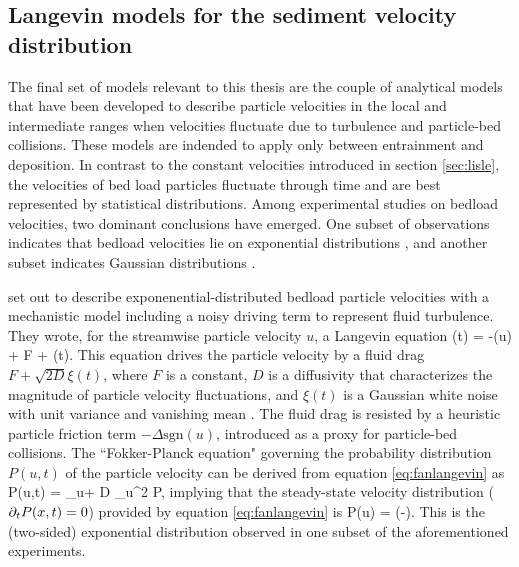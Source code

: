 \subsection{Langevin models for the sediment velocity distribution}

The final set of models relevant to this thesis are the couple of analytical models that have been developed to describe particle velocities in the local and intermediate ranges when velocities fluctuate due to turbulence and particle-bed collisions. These models are indended to apply only between entrainment and deposition.
In contrast to the constant velocities introduced in section \ref{sec:lisle}, the velocities of bed load particles fluctuate through time and are best represented by statistical distributions. 
Among experimental studies on bedload velocities, two dominant conclusions have emerged. One subset of observations indicates that bedload velocities lie on exponential distributions \citep{Lajeunesse2010,Furbish2012,Fathel2015}, and another subset indicates Gaussian distributions \citep{Martin2012,Ancey2014,Heyman2016}.

\citet{Fan2014} set out to describe exponenential-distributed bedload particle velocities with a mechanistic model including a noisy driving term to represent fluid turbulence.
They wrote, for the streamwise particle velocity $u$, a Langevin equation
\be {}(t) = -\Delta {}(u) + F + \xi(t). \label{eq:fanlangevin}\ee
This equation drives the particle velocity by a fluid drag $F + \sqrt{2D} \xi(t)$, where $F$ is a constant, $D$ is a diffusivity that characterizes the magnitude of particle velocity fluctuations, and $\xi(t)$ is a Gaussian white noise with unit variance and vanishing mean \citep{Gardiner1983}. The fluid drag is resisted by a heuristic particle friction term $-\Delta \text{sgn}(u)$, introduced as a proxy for particle-bed collisions. The ``Fokker-Planck equation" governing the probability distribution $P(u,t)$ of the particle velocity can be derived from equation \ref{eq:fanlangevin} as \citep{Risken1984,VanKampen2007} 
\be \pt P(u,t) = \Delta\partial_u + D \partial_u^2 P,\ee
implying that the steady-state velocity distribution ($\partial_t P(x,t) = 0$) provided by equation \ref{eq:fanlangevin} is
\be P(u) = \exp\Big(-\Big).\ee
This is the (two-sided) exponential distribution observed in one subset of the aforementioned experiments.

